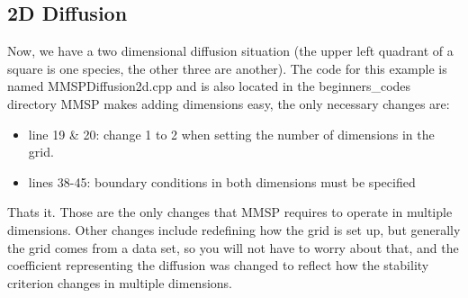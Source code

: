 \documentclass{article}
\begin{document}
\subsection{2D Diffusion}
Now, we have a two dimensional diffusion situation (the upper left quadrant of a square is one species, the other three are another). The code for this example is named MMSPDiffusion2d.cpp and is also located in the beginners_codes directory MMSP makes adding dimensions easy, the only necessary changes are:
\begin{itemize} \itemsep1pt \parskip0pt 
\item line 19 \& 20: change 1 to 2 when setting the number of dimensions in the grid. 
\item lines 38-45: boundary conditions in both dimensions must be specified
\end{itemize}
Thats it.  Those are the only changes that MMSP requires to operate in multiple dimensions.  Other changes include redefining how the grid is set up, but generally the grid comes from a data set, so you will not have to worry about that, and the coefficient representing the diffusion was changed to reflect how the stability criterion changes in multiple dimensions.
\end{document}
